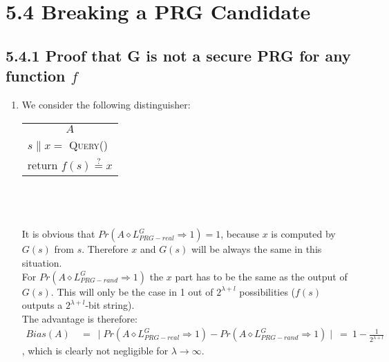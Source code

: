 \documentclass{report}
\begin{document}
	\section*{5.4 Breaking a PRG Candidate}
	\subsection*{5.4.1 Proof that G is not a secure PRG for any function $f$}
		\begin{enumerate}[]
			\item We consider the following distinguisher: \hspace*{2cm}
			\begin{tabular}{|l|}
				\hline \multicolumn{1}{|c|}{\cellcolor[gray]{0.8} $A$} \\
				$s \| x =$ \textsc{Query()} \\
				return $f(s) \stackrel{?}{=} x$ \\ \hline
			\end{tabular} \\ \\ \\
			It is obvious that $Pr(A \diamond L^G_{PRG-real} \Rightarrow 1) = 1$, because $x$ is computed by $G(s)$ from $s$. Therefore $x$ and $G(s)$ will be always the same in this situation. \\
			For $Pr(A \diamond L^G_{PRG-rand} \Rightarrow 1)$ the $x$ part has to be the same as the output of $G(s)$. This will only be the case in 1 out of $2^{\lambda + l}$ possibilities ($f(s)$ outputs a $2^{\lambda + l}$-bit string). \\
			The advantage is therefore:
			\begin{align*}
				Bias(A) \ & = \ \mid Pr(A \diamond L^G_{PRG-real} \Rightarrow 1) - Pr(A \diamond L^G_{PRG-rand} \Rightarrow 1) \mid \ = \ 1 - \frac{1}{2^{\lambda + l}}
			\end{align*}
			, which is clearly not negligible for $\lambda \rightarrow \infty$.
		\end{enumerate}
\end{document}
